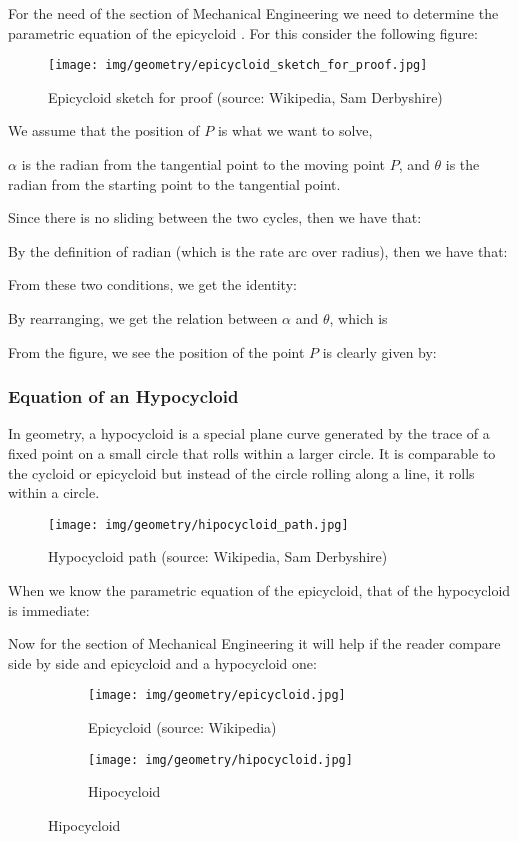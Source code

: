	For the need of the section of Mechanical Engineering we need to determine the parametric equation of the epicycloid . For this consider the following figure:
	\begin{figure}[H]
		\centering
		\texttt{[image: img/geometry/epicycloid\_sketch\_for\_proof.jpg]}
		\caption{Epicycloid sketch for proof (source: Wikipedia, Sam Derbyshire)}
	\end{figure}
	We assume that the position of $P$ is what we want to solve, {$\alpha$  is the radian from the tangential point to the moving point $P$, and $\theta$  is the radian from the starting point to the tangential point.

	Since there is no sliding between the two cycles, then we have that:
	
	By the definition of radian (which is the rate arc over radius), then we have that:
		
	From these two conditions, we get the identity:
	
	By rearranging, we get the relation between $\alpha$  and $\theta$, which is
	
	From the figure, we see the position of the point $P$ is clearly given by:
	
	
	\subsubsection{Equation of an Hypocycloid}
	In geometry, a hypocycloid is a special plane curve generated by the trace of a fixed point on a small circle that rolls within a larger circle. It is comparable to the cycloid or epicycloid but instead of the circle rolling along a line, it rolls within a circle.
	\begin{figure}[H]
		\centering
		\texttt{[image: img/geometry/hipocycloid\_path.jpg]}
		\caption{Hypocycloid path (source: Wikipedia, Sam Derbyshire)}
	\end{figure}
	When we know the parametric equation of the epicycloid, that of the hypocycloid is immediate:
	
	Now for the section of Mechanical Engineering it will help if the reader compare side by side and epicycloid and a hypocycloid one:
	\begin{figure}[H]
		\centering
		\begin{subfigure}{.4\textwidth}
		  \centering
		  \texttt{[image: img/geometry/epicycloid.jpg]}
		  \caption{Epicycloid (source: Wikipedia)}
		\end{subfigure}
		\begin{subfigure}{.4\textwidth}
		  \centering
		  \texttt{[image: img/geometry/hipocycloid.jpg]}
		  \caption{Hipocycloid}
		\end{subfigure}
	\end{figure}
		
}
